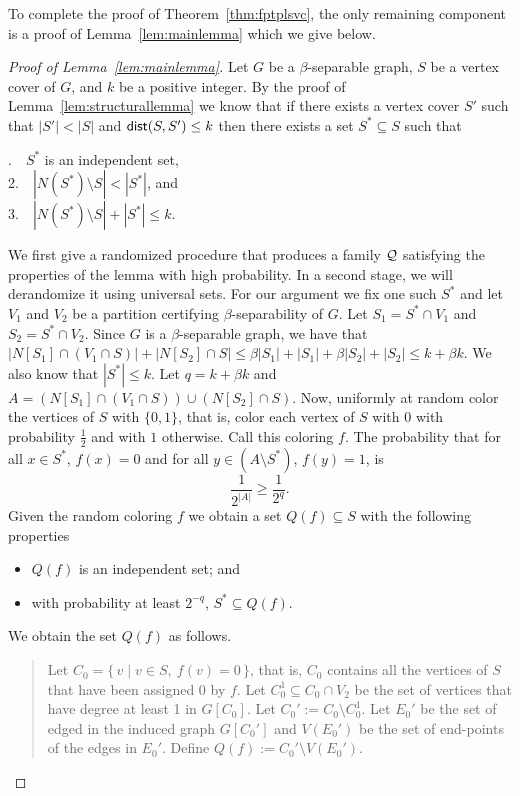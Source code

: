 \documentclass[10pt,usletter]{article}
\newcommand{\SB}{\{\,}\newcommand{\SM}{\;{|}\;}\newcommand{\SE}{\,\}}
\newcommand{\dist}{{\normalfont \textsf{dist}}}
\begin{document}
To complete the proof of Theorem~\ref{thm:fptplsvc}, the only remaining component is a proof of Lemma~\ref{lem:mainlemma} which 
we give below.
\begin{proof}[Proof of Lemma~\ref{lem:mainlemma}]
Let $G$ be a $\beta$-separable graph, $S$ be a vertex cover of $G$, and $k$ be a positive integer. 
By the proof of Lemma~\ref{lem:structurallemma} we know that if there exists a vertex cover
$S'$ such that $|S'|<|S|$ and $\dist(S,S')\leq k$ then there exists a set
$S^*\subseteq S$ such that 

\medskip
{}.~~$S^*$ is an independent set,\\
2.~~$|N(S^*)\setminus S|< |S^*|$, and\\
3.~~$|N(S^*)\setminus S|+|S^*|\leq k$.
\medskip

We first give a randomized procedure that produces a family $\cal Q$ satisfying the properties of the lemma with high probability.
In a second stage, we will derandomize
it using universal sets.
For our argument we fix one such $S^*$ and let $V_1$ and $V_2$ be a partition certifying $\beta$-separability of $G$. 
Let $S_1=S^*\cap V_1$ and $S_2=S^*\cap V_2$. 
Since $G$ is a $\beta$-separable graph, we have that $|N[S_1]\cap (V_1\cap S)|+|N[S_2]\cap S| \leq \beta |S_1| + |S_1| + \beta |S_2| + |S_2| \leq k+\beta k$. We also know that 
$|S^*|\leq k$. Let $q=k+\beta k$ and $A=(N[S_1]\cap (V_1\cap S))\cup (N[S_2]\cap S)$.  
Now, uniformly at random color the vertices of $S$ with $\{0,1\}$, that is, color each vertex of $S$ 
with $0$ with probability $\frac{1}{2}$ and with $1$ otherwise. Call this coloring $f$. 
The probability that for all $x \in S^*$, $f(x)=0$ and for all $y\in (A\setminus S^*)$, $f(y)=1$, is 
\[ \frac{1}{2^{|A|}} \geq  \frac{1}{2^q}.\] 
Given the random coloring $f$ we obtain a set $Q(f)\subseteq S$ with the following properties 
\begin{itemize}
\item  $Q(f)$ is an independent set; and 
\item  with probability at least $2^{-q}$, $S^*\subseteq Q(f)$. 
\end{itemize}
We obtain the set $Q(f)$ as follows. 
\begin{quote}
Let $C_0=\SB v \SM v\in S,~f(v)=0\SE$, that is, $C_0$ contains all the vertices of 
$S$ that have been assigned $0$ by $f$.  
Let $C_0^1 \subseteq C_0\cap V_2$ be the set of vertices that have degree at least 1
in $G[C_0]$. Let $C_0':=C_0\setminus C_0^1$. 
Let $E_0'$ be the set of edged in the induced 
graph $G[C_0']$ and $V(E_0')$ be the set of end-points of the edges in $E_0'$. 
Define $Q(f):=C_0'\setminus V(E_0')$. 
\end{quote}




\end{proof}
\end{document}
